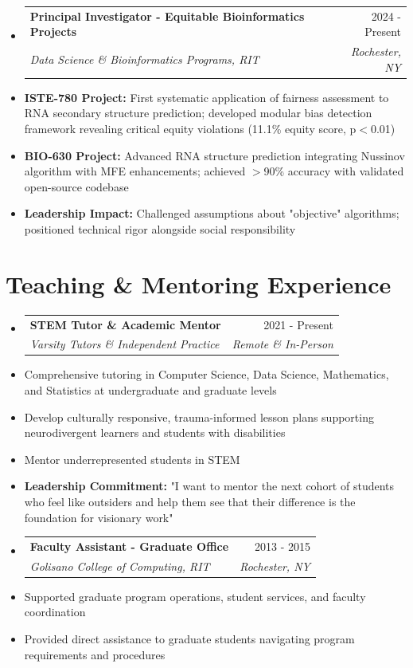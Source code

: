 \documentclass[10pt]{article}
\makeatletter
\newcommand{\resumeItem}[1]{\item\small{#1}}
\newcommand{\resumeSubheading}[4]{
  \vspace{-1pt}\item
    \begin{tabular*}{0.97\textwidth}[t]{l@{\extracolsep{\fill}}r}
      \textbf{#1} & #2 \\
      \textit{\small#3} & \textit{\small #4} \\
    \end{tabular*}\vspace{-5pt}
}
\makeatother
\begin{document}
\begin{itemize}[leftmargin=*]
\resumeSubheading
{Principal Investigator - Equitable Bioinformatics Projects}{2024 - Present}
{Data Science \& Bioinformatics Programs, RIT}{Rochester, NY}
\resumeItem{\textbf{ISTE-780 Project:} First systematic application of fairness assessment to RNA secondary structure prediction; developed modular bias detection framework revealing critical equity violations (11.1\% equity score, p$<$0.01)}
\resumeItem{\textbf{BIO-630 Project:} Advanced RNA structure prediction integrating Nussinov algorithm with MFE enhancements; achieved $>$90\% accuracy with validated open-source codebase}
\resumeItem{\textbf{Leadership Impact:} Challenged assumptions about "objective" algorithms; positioned technical rigor alongside social responsibility}
\end{itemize}


\section{Teaching \& Mentoring Experience}

\begin{itemize}[leftmargin=*]
\resumeSubheading
{STEM Tutor \& Academic Mentor}{2021 - Present}
{Varsity Tutors \& Independent Practice}{Remote \& In-Person}
\resumeItem{Comprehensive tutoring in Computer Science, Data Science, Mathematics, and Statistics at undergraduate and graduate levels}
\resumeItem{Develop culturally responsive, trauma-informed lesson plans supporting neurodivergent learners and students with disabilities}
\resumeItem{Mentor underrepresented students in STEM}
\resumeItem{\textbf{Leadership Commitment:} "I want to mentor the next cohort of students who feel like outsiders and help them see that their difference is the foundation for visionary work"}

\resumeSubheading
{Faculty Assistant - Graduate Office}{2013 - 2015}
{Golisano College of Computing, RIT}{Rochester, NY}
\resumeItem{Supported graduate program operations, student services, and faculty coordination}
\resumeItem{Provided direct assistance to graduate students navigating program requirements and procedures}
\end{itemize}

\end{document}
